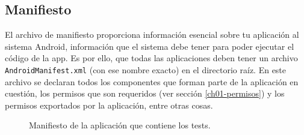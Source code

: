 \subsection{Manifiesto}
El archivo de manifiesto proporciona información esencial sobre tu aplicación al sistema Android, información que el sistema debe tener para poder ejecutar el código de la app. Es por ello, que todas las aplicaciones deben tener un archivo \texttt{AndroidManifest.xml} (con ese nombre exacto) en el directorio raíz. En este archivo se declaran todos los componentes que forman parte de la aplicación en cuestión, los permisos que son requeridos (ver sección \ref{ch01-permisos}) y los permisos exportados por la aplicación, entre otras cosas.
\begin{figure}[hbtp]
    \centering
    
    \caption{Manifiesto de la aplicación que contiene los tests.}
    \label{fig:ch01:manifest}
\end{figure}
